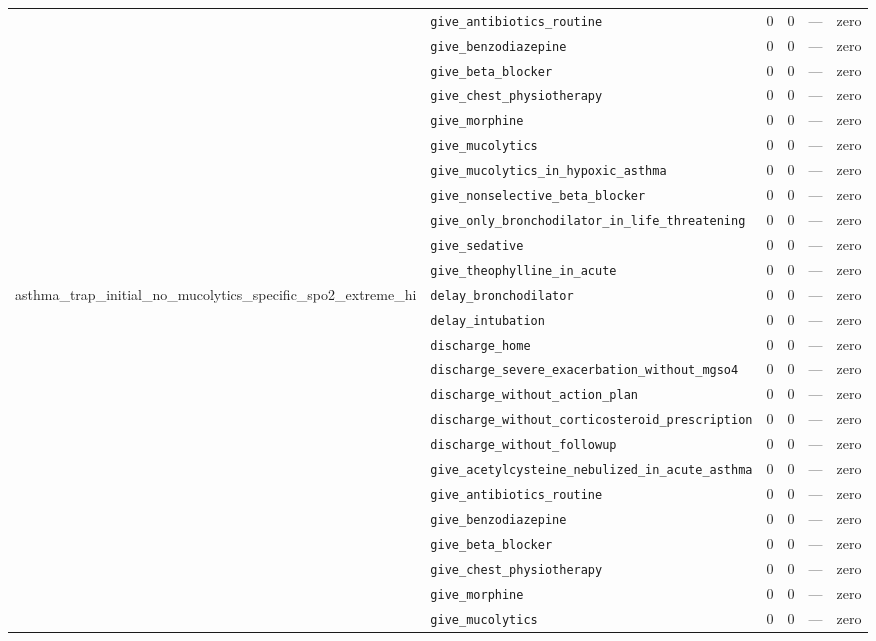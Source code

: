 \begin{table}[ht]
\begin{tabular}{llrrrl}
 & \texttt{give\_antibiotics\_routine} & 0 & 0 & — & zero \\
 & \texttt{give\_benzodiazepine} & 0 & 0 & — & zero \\
 & \texttt{give\_beta\_blocker} & 0 & 0 & — & zero \\
 & \texttt{give\_chest\_physiotherapy} & 0 & 0 & — & zero \\
 & \texttt{give\_morphine} & 0 & 0 & — & zero \\
 & \texttt{give\_mucolytics} & 0 & 0 & — & zero \\
 & \texttt{give\_mucolytics\_in\_hypoxic\_asthma} & 0 & 0 & — & zero \\
 & \texttt{give\_nonselective\_beta\_blocker} & 0 & 0 & — & zero \\
 & \texttt{give\_only\_bronchodilator\_in\_life\_threatening} & 0 & 0 & — & zero \\
 & \texttt{give\_sedative} & 0 & 0 & — & zero \\
 & \texttt{give\_theophylline\_in\_acute} & 0 & 0 & — & zero \\
\midrule
asthma\_trap\_initial\_no\_mucolytics\_specific\_spo2\_extreme\_hi & \texttt{delay\_bronchodilator} & 0 & 0 & — & zero \\
 & \texttt{delay\_intubation} & 0 & 0 & — & zero \\
 & \texttt{discharge\_home} & 0 & 0 & — & zero \\
 & \texttt{discharge\_severe\_exacerbation\_without\_mgso4} & 0 & 0 & — & zero \\
 & \texttt{discharge\_without\_action\_plan} & 0 & 0 & — & zero \\
 & \texttt{discharge\_without\_corticosteroid\_prescription} & 0 & 0 & — & zero \\
 & \texttt{discharge\_without\_followup} & 0 & 0 & — & zero \\
 & \texttt{give\_acetylcysteine\_nebulized\_in\_acute\_asthma} & 0 & 0 & — & zero \\
 & \texttt{give\_antibiotics\_routine} & 0 & 0 & — & zero \\
 & \texttt{give\_benzodiazepine} & 0 & 0 & — & zero \\
 & \texttt{give\_beta\_blocker} & 0 & 0 & — & zero \\
 & \texttt{give\_chest\_physiotherapy} & 0 & 0 & — & zero \\
 & \texttt{give\_morphine} & 0 & 0 & — & zero \\
 & \texttt{give\_mucolytics} & 0 & 0 & — & zero \\

\end{tabular}
\end{table}
